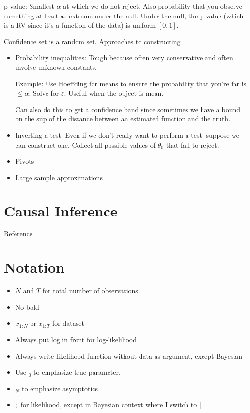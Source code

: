 \documentclass[12pt]{article}
\theoremstyle{plain}
\theoremstyle{definition}
\theoremstyle{remark}
\begin{document}
p-value: Smallest $\alpha$ at which we do not reject.
Also probability that you observe something at least as extreme under
the null.
Under the null, the p-value (which is a RV since it's a function of the
data) is uniform $[0,1]$.


Confidence set is a random set.
Approaches to constructing
\begin{itemize}
  \item Probability inequalities:
    Tough because often very conservative and often involve unknown
    constants.

    Example: Use Hoeffding for means to ensure the probability that
    you're far is $\leq \alpha$. Solve for $\varepsilon$.
    Useful when the object is mean.

    Can also do this to get a confidence band since sometimes we have a
    bound on the sup of the distance between an estimated function and
    the truth.

  \item Inverting a test:
    Even if we don't really want to perform a test, suppose we can
    construct one. Collect all possible values of $\theta_0$ that fail
    to reject.

  \item Pivots
  \item Large sample approximations
\end{itemize}








\clearpage
\section{Causal Inference}

\href{http://www.stat.cmu.edu/~larry/=stat705/Lecture17.pdf}{Reference}








\clearpage
\section{Notation}

\begin{itemize}
  \item $N$ and $T$ for total number of observations.
  \item No bold
  \item $x_{1:N}$ or $x_{1:T}$ for dataset
  \item Always put log in front for log-likelihood
  \item Always write likelihood function without data as argument,
    except Bayesian
  \item Use ${}_0$ to emphasize true parameter.
  \item ${}_N$ to emphasize asymptotics
  \item $;$ for likelihood, except in Bayesian context where I switch to
    $|$
\end{itemize}
\end{document}
